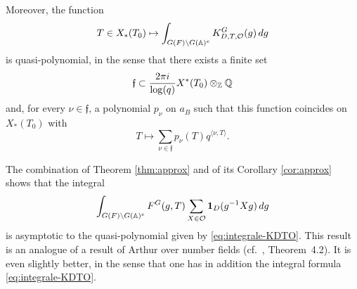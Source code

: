 \begin{paragr}
\begin{corollaire}
Moreover, the function
$$T\in X_*(T_0)\mapsto \int_{G(F)\backslash G(\mathbb{A})^e} K^G_{D,T,\mathcal{O}}(g)\, dg$$
is quasi-polynomial, in the sense that there exists a finite set
$$\mathfrak{f}\subset \frac{2\pi i}{\log(q)} X^*(T_0)\otimes_{\mathbb{Z}} \mathbb{Q}$$
and, for every $\nu\in \mathfrak{f}$, a polynomial $p_\nu$ on $a_B$ such that this function coincides on $X_*(T_0)$ with
$$T\mapsto \sum_{\nu\in \mathfrak{f}} p_\nu(T) q^{\langle \nu,T\rangle}.$$
\end{corollaire}

\begin{remarque}\label{rq:asymptotique}
  The combination of Theorem \ref{thm:approx} and of its Corollary \ref{cor:approx} shows that the integral
$$\int_{G(F)\backslash G(\mathbb{A})^e} F^G(g,T)\sum_{X\in \mathcal{O}} \mathbf{1}_D(g^{-1}Xg)\, dg$$
is asymptotic to the quasi-polynomial given by \eqref{eq:integrale-KDTO}. This result is an analogue of a result of Arthur over number fields (cf.\ \cite{ar-mesure}, Theorem~4.2). It is even slightly better, in the sense that one has in addition the integral formula \eqref{eq:integrale-KDTO}.
\end{remarque}
\end{paragr}

